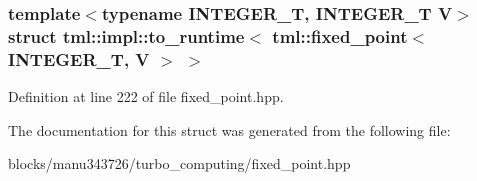 \subsubsection*{template$<$typename I\+N\+T\+E\+G\+E\+R\+\_\+\+T, I\+N\+T\+E\+G\+E\+R\+\_\+\+T V$>$struct tml\+::impl\+::to\+\_\+runtime$<$ tml\+::fixed\+\_\+point$<$ I\+N\+T\+E\+G\+E\+R\+\_\+\+T, V $>$ $>$}



Definition at line 222 of file fixed\+\_\+point.\+hpp.



The documentation for this struct was generated from the following file\+:\begin{DoxyCompactItemize}
\item 
blocks/manu343726/turbo\+\_\+computing/fixed\+\_\+point.\+hpp\end{DoxyCompactItemize}

